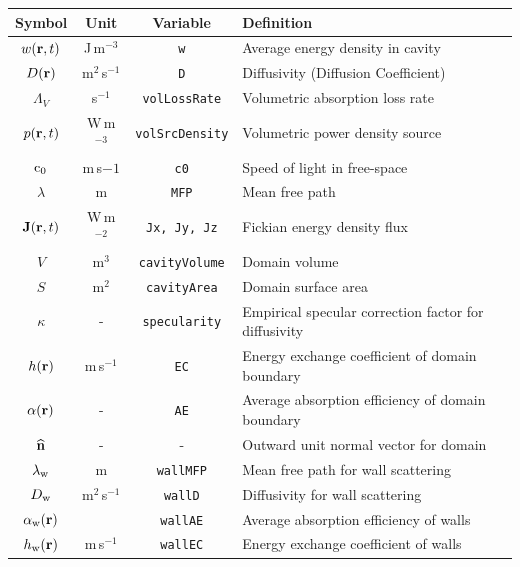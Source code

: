 \documentclass[a4paper]{article}
\numberwithin{equation}{section}
\begin{document}
\begin{center}
\begin{supertabular}{|c|c|c|l|}
\hline
\textbf{Symbol}     &\textbf{Unit}   &\textbf{Variable}           &\textbf{Definition} \\
\hline
$w(\boldsymbol{\mathrm{r}},t)$             &J\,m$^{-3}$     &\texttt{w}                  &Average energy density in cavity \\
$D(\boldsymbol{\mathrm{r}})$              &m$^2$\,s$^{-1}$ &\texttt{D}                  &Diffusivity (Diffusion Coefficient) \\
$\Lambda _V$        &s$^{-1}$        &\texttt{volLossRate}        &Volumetric absorption loss rate \\
$p(\boldsymbol{\mathrm{r}},t)$             &W\,m$^{-3}$     &\texttt{volSrcDensity}      &Volumetric power density source \\
$\mathrm{c}_0$             &m\,s${-1}$      &\texttt{c0}                 &Speed of light in free-space \\
$\lambda$           &m               &\texttt{MFP}                &Mean free path \\
$\boldsymbol{\mathrm{J}}(\boldsymbol{\mathrm{r}},t)$           &W\,m$^{-2}$     &\texttt{Jx, Jy, Jz}         &Fickian energy density flux \\
$V$                 &m$^3$           &\texttt{cavityVolume}       &Domain volume \\
$S$                 &m$^2$           &\texttt{cavityArea}         &Domain surface area \\
$\kappa$            &-               &\texttt{specularity}        &Empirical specular correction factor for diffusivity \\
$h(\boldsymbol{\mathrm{r}})$              &m\,s$^{-1}$     &\texttt{EC}                 &Energy exchange coefficient of domain boundary \\
$\alpha(\boldsymbol{\mathrm{r}})$         &-               &\texttt{AE}                 &Average absorption efficiency of domain boundary \\
$\widehat{\boldsymbol{\mathrm{n}}}$              &-               &-                           &Outward unit normal vector for domain \\
$\lambda_{\mathrm{w}}$       &m               &\texttt{wallMFP}            &Mean free path for wall scattering \\
$D_{\mathrm{w}}$             &m$^2$\,s$^{-1}$ &\texttt{wallD}              &Diffusivity for wall scattering \\
$\alpha_{\mathrm{w}}(\boldsymbol{\mathrm{r}})$     &~               &\texttt{wallAE}             &Average absorption efficiency of walls \\
$h_{\mathrm{w}}(\boldsymbol{\mathrm{r}})$          &m\,s$^{-1}$     &\texttt{wallEC}             &Energy exchange coefficient of walls \\

\end{supertabular}
\end{center}
\end{document}
